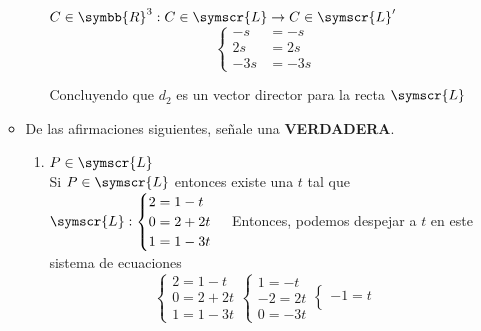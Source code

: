 \documentclass{article}
\def\fancyL{\symscr{L}}
\def\realR{\symbb{R}}
\begin{document}
\begin{enumerate}
\begin{itemize}
\begin{enumerate}[label=\listAlph]
\begin{mathcase}{\(C \in \realR^3: C \in \fancyL \rightarrow C \in \fancyL'\)}
\[                                \left\{
                                \begin{aligned}
                                    -s &= -s \\
                                    2s &= 2s \\
                                    -3s &= -3s
                                \end{aligned}
                                \right.
                            \]
                        \end{mathcase}
                        Concluyendo que \(d_2\) es un vector director para la recta \(\fancyL\)
                \end{enumerate}
            \item De las afirmaciones siguientes, señale una \textbf{VERDADERA}.
                \begin{enumerate}
                    \item \(P \in \fancyL\) \\
                        Si \(P \in \fancyL\) entonces existe una \(t\) tal que 
                        \(
                            \fancyL :
                            \begin{cases}
                                2 = 1 - t \\
                                0 = 2 + 2t \\
                                1 = 1 -3t
                            \end{cases}
                        \)
                        Entonces, podemos despejar a \(t\) en este sistema de ecuaciones
                        \[
                            \begin{cases}
                                2 = 1 - t \\
                                0 = 2 + 2t \\
                                1 = 1 -3t
                            \end{cases}
                            \begin{cases}
                                1 = -t \\
                                -2 = 2t \\
                                0 = -3t
                            \end{cases}
                            \begin{cases}
                                -1 = t \\

\end{cases}\]
\end{enumerate}
\end{itemize}
\end{enumerate}
\end{document}
